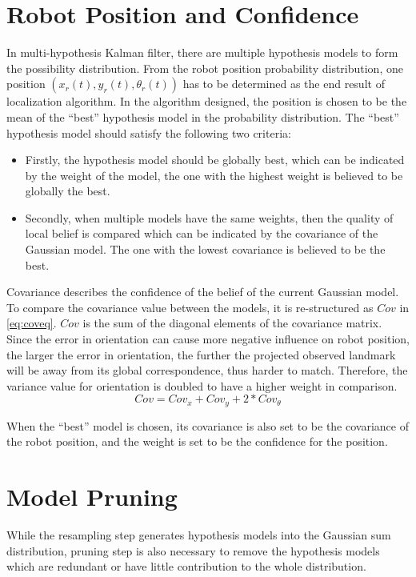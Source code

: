 \section{Robot Position and Confidence}\label{sec:robotpose}
In multi-hypothesis Kalman filter, there are multiple hypothesis models to form the possibility distribution. From the robot position probability distribution, one position $(x_{r}(t), y_{r}(t), \theta_{r}(t))$
has to be determined as the end result of localization algorithm. In the algorithm designed, the position is chosen to be the mean of the ``best'' hypothesis model in the probability distribution. The  ``best'' hypothesis model should satisfy the following two criteria:
\begin{itemize}
  \item Firstly, the hypothesis model should be globally best, which can be indicated by the weight of the model, the one with the highest weight is believed to be globally the best.
   \item Secondly, when multiple models have the same weights, then the quality of local belief is compared which can be indicated by the covariance of the Gaussian model. The one with the lowest covariance is believed to be the best.
\end{itemize}

Covariance describes the confidence of the belief of the current Gaussian model. To compare the covariance value between the models, it is re-structured as $Cov$ in \autoref{eq:coveq}. $Cov$ is the sum of the diagonal elements of the covariance matrix. Since the error in orientation can cause more negative influence on robot position, \ie the larger the error in orientation, the further the projected observed landmark will be away from its global correspondence, thus harder to match. Therefore, the variance value for orientation is doubled to have a higher weight in comparison.
\begin{equation}
\label{eq:coveq}
Cov = Cov_x + Cov_y +2*Cov_{\theta}
\end{equation}

When the ``best'' model is chosen, its covariance is also set to be the covariance of the robot position, and the weight is set to be the confidence for the position.

\section{Model Pruning}\label{sec:pruning}
While the resampling step generates hypothesis models into the Gaussian sum distribution, pruning step is also necessary to remove the hypothesis models which are redundant or have little contribution to the whole distribution.

